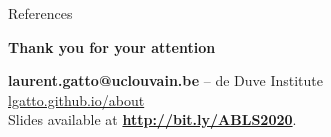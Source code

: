 \documentclass{beamer}
\theoremstyle{example}
\begin{document}


\begin{frame}[allowframebreaks]{References}
  \scriptsize
  
  
\end{frame}



\begin{frame}%

\vspace{.1cm}



\begin{center}
  \textbf{Thank you for your attention}
\end{center}


\bigskip

\begin{center}
  \textbf{laurent.gatto@uclouvain.be} – de Duve Institute \\
  \url{lgatto.github.io/about} \\
  Slides available at \textbf{\url{http://bit.ly/ABLS2020}}.
\end{center}

\end{frame}
\end{document}
